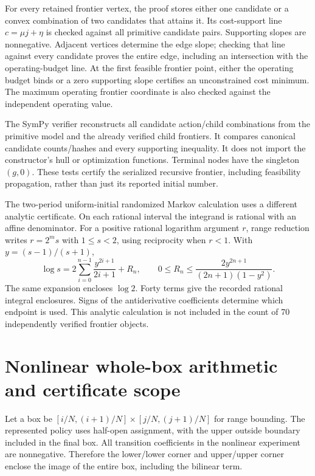For every retained frontier vertex, the proof stores either one candidate or a convex combination of two candidates that attains it. Its cost-support line $c=\mu j+\eta$ is checked against all primitive candidate pairs. Supporting slopes are nonnegative. Adjacent vertices determine the edge slope; checking that line against every candidate proves the entire edge, including an intersection with the operating-budget line. At the first feasible frontier point, either the operating budget binds or a zero supporting slope certifies an unconstrained cost minimum. The maximum operating frontier coordinate is also checked against the independent operating value.

The SymPy verifier reconstructs all candidate action/child combinations from the primitive model and the already verified child frontiers. It compares canonical candidate counts/hashes and every supporting inequality. It does not import the constructor's hull or optimization functions. Terminal nodes have the singleton $(g,0)$. These tests certify the serialized recursive frontier, including feasibility propagation, rather than just its reported initial number.

The two-period uniform-initial randomized Markov calculation uses a different analytic certificate. On each rational interval the integrand is rational with an affine denominator. For a positive rational logarithm argument $r$, range reduction writes $r=2^m s$ with $1\leq s<2$, using reciprocity when $r<1$. With $y=(s-1)/(s+1)$,
\[
 \log s=2\sum_{i=0}^{n-1}\frac{y^{2i+1}}{2i+1}+R_n,
 \qquad 0\leq R_n\leq\frac{2y^{2n+1}}{(2n+1)(1-y^2)}.
\]
The same expansion encloses $\log2$. Forty terms give the recorded rational integral enclosures. Signs of the antiderivative coefficients determine which endpoint is used. This analytic calculation is not included in the count of 70 independently verified frontier objects.

\section{Nonlinear whole-box arithmetic and certificate scope}
Let a box be $[i/N,(i+1)/N]\times[j/N,(j+1)/N]$ for range bounding. The represented policy uses half-open assignment, with the upper outside boundary included in the final box. All transition coefficients in the nonlinear experiment are nonnegative. Therefore the lower/lower corner and upper/upper corner enclose the image of the entire box, including the bilinear term.

